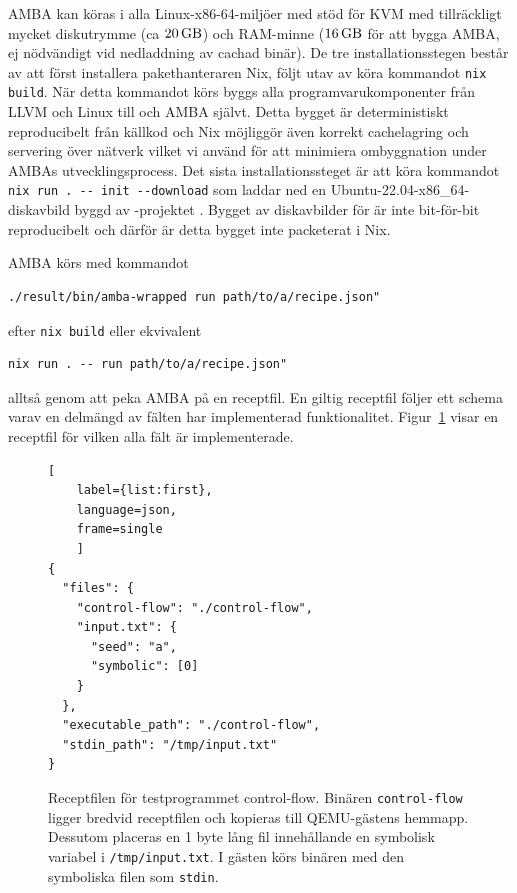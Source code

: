AMBA kan köras i alla Linux-x86-64-miljöer med stöd för KVM med tillräckligt
mycket diskutrymme (ca $\SI{20}{\giga\byte}$) och RAM-minne
($\SI{16}{\giga\byte}$ för att bygga AMBA, ej nödvändigt vid nedladdning av
cachad binär). De tre installationsstegen består av att först installera
pakethanteraren Nix, följt utav av köra kommandot \lstinline{nix build}.  När
detta kommandot körs byggs alla programvarukomponenter från LLVM och Linux till
\stoe{} och AMBA självt. Detta bygget är deterministiskt reproducibelt från
källkod och Nix möjliggör även korrekt cachelagring och servering över nätverk
vilket vi använd för att minimiera ombyggnation under AMBAs utvecklingsprocess.
Det sista installationssteget är att köra kommandot
\lstinline{nix run . -- init --download}
som laddar ned en Ubuntu-22.04-x86\_64-diskavbild byggd av \stoe{}-projektet
. Bygget av diskavbilder för \stoe{} är inte bit-för-bit reproducibelt
och därför är detta bygget inte packeterat i Nix.

AMBA körs med kommandot
\begin{verbatim}
./result/bin/amba-wrapped run path/to/a/recipe.json"
\end{verbatim}
efter \lstinline{nix build} eller ekvivalent
\begin{verbatim}
nix run . -- run path/to/a/recipe.json"
\end{verbatim}
alltså genom att peka AMBA på en receptfil. En giltig receptfil följer ett
schema varav en delmängd av fälten har implementerad funktionalitet.
Figur~\ref{fig:recipe} visar en receptfil för vilken alla fält är
implementerade.

\begin{figure}
    \begin{lstlisting}[
    label={list:first},
    language=json,
    frame=single
    ]
{
  "files": {
    "control-flow": "./control-flow",
    "input.txt": {
      "seed": "a",
      "symbolic": [0]
    }
  },
  "executable_path": "./control-flow",
  "stdin_path": "/tmp/input.txt"
}
\end{lstlisting}\label{fig:recipe}

    \caption{Receptfilen för testprogrammet control-flow. Binären
        \texttt{control-flow} ligger bredvid receptfilen och kopieras till
        QEMU-gästens hemmapp. Dessutom placeras en 1 byte lång fil innehållande en
        symbolisk variabel i \texttt{/tmp/input.txt}. I gästen körs binären med den
        symboliska filen som \texttt{stdin}.}

\end{figure}

